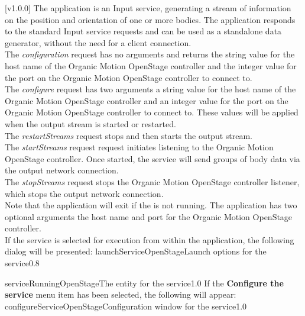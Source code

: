 [v1.0.0]
The  application is an Input service,
generating a stream of information on the position and orientation of one or more bodies.
The application responds to the standard Input service requests and can be used as a
standalone data generator, without the need for a client connection.\\

The \emph{configuration} request has no arguments and returns the string value for the
host name of the Organic Motion OpenStage controller and the integer value for the port on
the Organic Motion OpenStage controller to connect to.\\

The \emph{configure} request has two arguments \longDash{} a string value for the host
name of the Organic Motion OpenStage controller and an integer value for the port on the
Organic Motion OpenStage controller to connect to.
These values will be applied when the output stream is started or restarted.\\ 

The \emph{restartStreams} request stops and then starts the output stream.\\

The \emph{startStreams} request request initiates listening to the Organic Motion
OpenStage controller.
Once started, the service will send groups of body data via the output \yarp{} network
connection.\\

The \emph{stopStreams} request stops the Organic Motion OpenStage controller listener,
which stops the output \yarp{} network connection.\\ 

Note that the application will exit if the \emph{\RS} is not running.
The application has two optional arguments \longDash{} the host name and port for the
Organic Motion OpenStage controller.
\insertAppParameters
\insertTagDescription{\OSI}
\insertInputServiceComment\\

\insertStandardServiceCommands
\secondaryEnd
\condPage
{}
If the service is selected for execution from within the \emph{\MMMU} application, the
following dialog will be presented:
%
{launchServiceOpenStage}{Launch options for the \emph{\OSI} service}{0.8}

%
{serviceRunningOpenStage}{The \emph{\MMMU} entity for the \emph{\OSI} service}{1.0}
\condPage{}
If the \textbf{Configure the service} menu item has been selected, the following will
appear:
%
{configureServiceOpenStage}{Configuration window for the \emph{\OSI} service}{1.0}
\secondaryEnd
\primaryEnd{}
